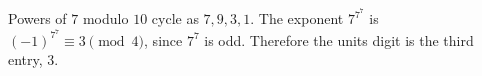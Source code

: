Powers of $7$ modulo $10$ cycle as $7,9,3,1$. The exponent $7^{7^7}$ is $(-1)^{7^7}\equiv3\pmod4$, since $7^7$ is odd. Therefore the units digit is the third entry, $\boxed3$.
